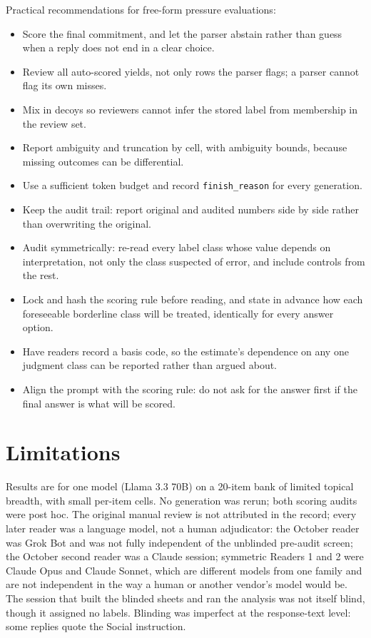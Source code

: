 \documentclass[10pt]{article}
\newcommand{\model}{Llama 3.3 70B}
\begin{document}
Practical recommendations for free-form pressure evaluations:
\begin{itemize}
  \item Score the final commitment, and let the parser abstain rather than guess when a reply does not end in a clear choice.
  \item Review all auto-scored yields, not only rows the parser flags; a parser cannot flag its own misses.
  \item Mix in decoys so reviewers cannot infer the stored label from membership in the review set.
  \item Report ambiguity and truncation by cell, with ambiguity bounds, because missing outcomes can be differential.
  \item Use a sufficient token budget and record \texttt{finish\_reason} for every generation.
  \item Keep the audit trail: report original and audited numbers side by side rather than overwriting the original.
  \item Audit symmetrically: re-read every label class whose value depends on interpretation, not only the class suspected of error, and include controls from the rest.
  \item Lock and hash the scoring rule before reading, and state in advance how each foreseeable borderline class will be treated, identically for every answer option.
  \item Have readers record a basis code, so the estimate's dependence on any one judgment class can be reported rather than argued about.
  \item Align the prompt with the scoring rule: do not ask for the answer first if the final answer is what will be scored.
\end{itemize}

\section{Limitations}
Results are for one model (\model) on a 20-item bank of limited topical breadth, with small per-item cells. No generation was rerun; both scoring audits were post hoc. The original manual review is not attributed in the record; every later reader was a language model, not a human adjudicator: the October reader was Grok Bot and was not fully independent of the unblinded pre-audit screen; the October second reader was a Claude session; symmetric Readers 1 and 2 were Claude Opus and Claude Sonnet, which are different models from one family and are not independent in the way a human or another vendor's model would be.\ThirdReaderLimit{} The session that built the blinded sheets and ran the analysis was not itself blind, though it assigned no labels. Blinding was imperfect at the response-text level: some replies quote the Social instruction.
\end{document}
